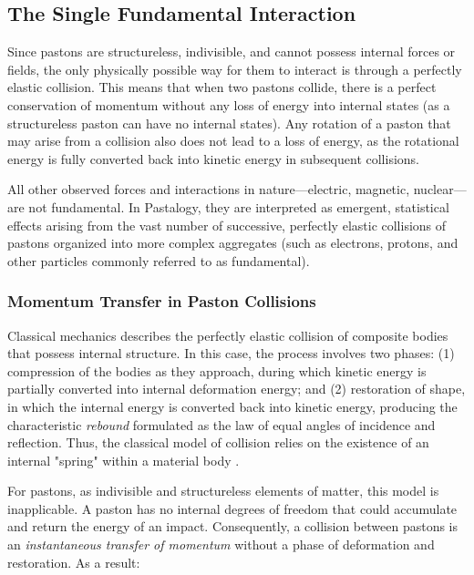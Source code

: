 \documentclass[pdflatex,sn-mathphys-num,referee]{sn-jnl}
\begin{document}
\subsection{The Single Fundamental Interaction}\label{subsec:interaction}

Since pastons are structureless, indivisible, and cannot possess internal forces or fields, the only physically possible way for them to interact is through a perfectly elastic collision. This means that when two pastons collide, there is a perfect conservation of momentum without any loss of energy into internal states (as a structureless paston can have no internal states). Any rotation of a paston that may arise from a collision also does not lead to a loss of energy, as the rotational energy is fully converted back into kinetic energy in subsequent collisions.

All other observed forces and interactions in nature---electric, magnetic, nuclear---are not fundamental. In Pastalogy, they are interpreted as emergent, statistical effects arising from the vast number of successive, perfectly elastic collisions of pastons organized into more complex aggregates (such as electrons, protons, and other particles commonly referred to as fundamental).

\subsubsection{Momentum Transfer in Paston Collisions}\label{subsubsec:impulse-transfer}

Classical mechanics describes the perfectly elastic collision of composite bodies that possess internal structure. In this case, the process involves two phases: (1) compression of the bodies as they approach, during which kinetic energy is partially converted into internal deformation energy; and (2) restoration of shape, in which the internal energy is converted back into kinetic energy, producing the characteristic \emph{rebound} formulated as the law of equal angles of incidence and reflection. Thus, the classical model of collision relies on the existence of an internal "spring" within a material body \cite{feynman-lectures-v1}.

For pastons, as indivisible and structureless elements of matter, this model is inapplicable. A paston has no internal degrees of freedom that could accumulate and return the energy of an impact. Consequently, a collision between pastons is an \emph{instantaneous transfer of momentum} without a phase of deformation and restoration. As a result:
\end{document}
